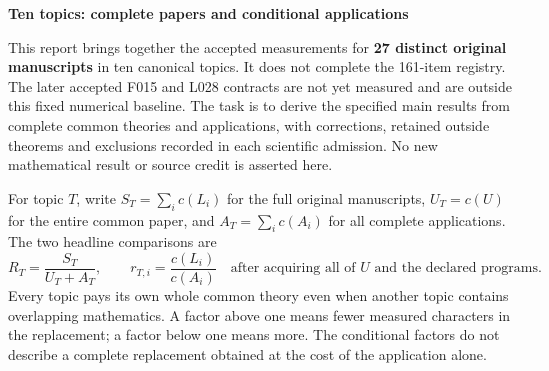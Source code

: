 \documentclass[11pt,a4paper]{article}
\begin{document}
\begin{center}\Large\textbf{Ten topics: complete papers and conditional applications}\end{center}
This report brings together the accepted measurements for \textbf{27 distinct original manuscripts} in ten canonical topics. It does not complete the 161-item registry. The later accepted F015 and L028 contracts are not yet measured and are outside this fixed numerical baseline. The task is to derive the specified main results from complete common theories and applications, with corrections, retained outside theorems and exclusions recorded in each scientific admission. No new mathematical result or source credit is asserted here.

For topic $T$, write $S_T=\sum_i c(L_i)$ for the full original manuscripts, $U_T=c(U)$ for the entire common paper, and $A_T=\sum_i c(A_i)$ for all complete applications. The two headline comparisons are
\[
 R_T=\frac{S_T}{U_T+A_T},\qquad
 r_{T,i}=\frac{c(L_i)}{c(A_i)}\quad
 \text{after acquiring all of $U$ and the declared programs.}
\]
Every topic pays its own whole common theory even when another topic contains overlapping mathematics. A factor above one means fewer measured characters in the replacement; a factor below one means more. The conditional factors do not describe a complete replacement obtained at the cost of the application alone.
\end{document}
